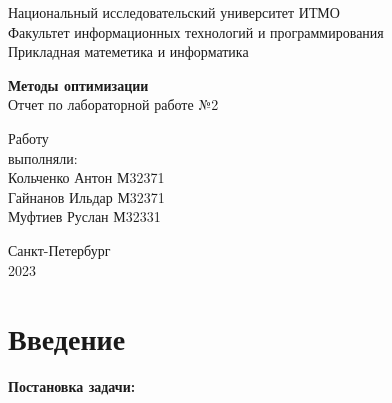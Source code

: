 \documentclass[a4paper,14pt,oneside,openany]{memoir}
\title{}
\author{}
\begin{document}
\thispagestyle{empty}

\begin{center}
	
	Национальный исследовательский университет ИТМО\\
	Факультет информационных технологий и программирования\\
	Прикладная матеметика и информатика\\
	
	\vspace{20pt}
	
\end{center}

\vfill

\begin{center}
	\textbf {\fontsize{100}{120}\selectfont Методы оптимизации
	} \\  
	Отчет по лабораторной работе №2
	
\end{center}

\vfill

\begin{flushright}
	
	\hfill {
		Работу \\
		выполняли: \\
		Кольченко Антон М32371 \\ 
		Гайнанов Ильдар М32371 \\ 
		Муфтиев Руслан М32331\\ 
	}
	\vspace{20pt}
	
\end{flushright}

\vfill

\begin{center}
	Санкт-Петербург\\
	2023
\end{center}

\chapter*{Введение}
\textbf{Постановка задачи:}
\end{document}

